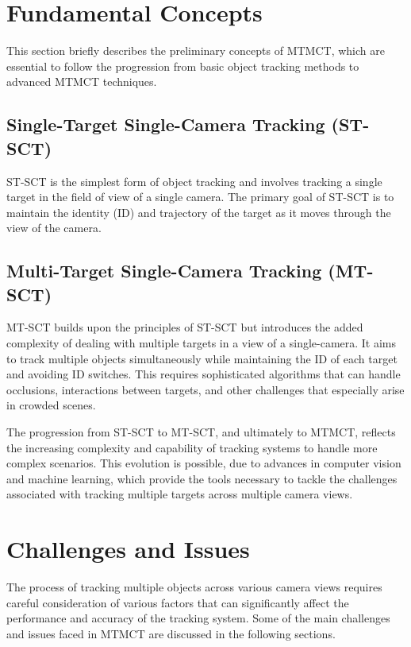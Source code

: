 \section{Fundamental Concepts}\label{sec:fundamental_concepts}
This section briefly describes the preliminary concepts of MTMCT, which are essential to follow the progression from basic object tracking methods to advanced MTMCT techniques.

\subsection{Single-Target Single-Camera Tracking (ST-SCT)}\label{subsec:st_sct}
ST-SCT is the simplest form of object tracking and involves tracking a single target in the field of view of a single camera. The primary goal of ST-SCT is to maintain the identity (ID) and trajectory of the target as it moves through the view of the camera.

\subsection{Multi-Target Single-Camera Tracking (MT-SCT)}\label{subsec:mt_sct}
MT-SCT builds upon the principles of ST-SCT but introduces the added complexity of dealing with multiple targets in a view of a single-camera. It aims to track multiple objects simultaneously while maintaining the ID of each target and avoiding ID switches. This requires sophisticated algorithms that can handle occlusions, interactions between targets, and other challenges that especially arise in crowded scenes.

The progression from ST-SCT to MT-SCT, and ultimately to MTMCT, reflects the increasing complexity and capability of tracking systems to handle more complex scenarios. This evolution is possible, due to advances in computer vision and machine learning, which provide the tools necessary to tackle the challenges associated with tracking multiple targets across multiple camera views.

\section{Challenges and Issues}\label{sec:challenges_and_issues}
The process of tracking multiple objects across various camera views requires careful consideration of various factors that can significantly affect the performance and accuracy of the tracking system. Some of the main challenges and issues faced in MTMCT are discussed in the following sections.

